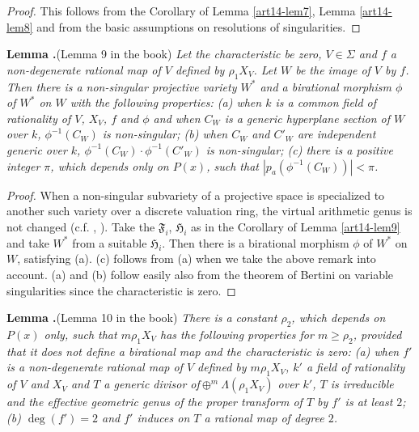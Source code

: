 \begin{proof}
This follows from the Corollary of Lemma \ref{art14-lem7}, Lemma \ref{art14-lem8} and from the basic assumptions on resolutions of singularities.
\end{proof}

\medskip
\noindent
{\bf Lemma .\label{art14-lem10}}(Lemma 9 in the book)
{\em 
Let the characteristic be zero, $V\in\Sigma$ and $f$ a non-degene\-rate rational map of $V$ defined by $\rho_{1}X_{V}$. Let $W$ be the image of $V$ by $f$. Then there is a non-singular projective variety $W^{*}$ and a birational morphism $\phi$ of $W^{*}$ on $W$ with the following properties: {\rm(a)} when $k$ is a common field of rationality of $V$, $X_{V}$, $f$ and $\phi$ and when $C_{W}$ is a generic hyperplane section of $W$ over $k$, $\phi^{-1}(C_{W})$ is non-singular; {\rm(b)} when $C_{W}$ and $C'_{W}$ are independent generic over $k$, $\phi^{-1}(C_{W})\cdot \phi^{-1}(C'_{W})$ is non-singular; {\rm(c)} there is a positive integer $\pi$, which depends only on $P(x)$, such that $|p_{a}(\phi^{-1}(C_{W}))|<\pi$.}

\begin{proof}
When a non-singular subvariety of a projective space is specialized to another such variety over a discrete valuation ring, the virtual arithmetic genus is not changed (c.f. \cite{art14-key2}, \cite{art14-key4}). Take the $\mathfrak{F}_{i}$, $\mathfrak{H}_{i}$ as in the Corollary of Lemma \ref{art14-lem9} and take $W^{*}$ from a suitable $\mathfrak{H}_{i}$. Then there is a birational morphism $\phi$ of $W^{*}$ on $W$, satisfying (a). (c) follows from (a) when we take the above remark into account. (a) and (b) follow easily also from the theorem of Bertini on variable singularities since the characteristic is zero.
\end{proof}

\smallskip
\noindent
{\bf Lemma .\label{art14-lem11}}(Lemma 10 in the book)
{\em There is a constant $\rho_{2}$, which depends on $P(x)$ only, such that $m\rho_{1}X_{V}$ has the following properties for $m\geq \rho_{2}$, provided that it does not define a birational map and the characteristic is zero: {\rm(a)} when $f'$ is a non-degenerate rational map of $V$ defined by $m\rho_{1}X_{V}$, $k'$ a field of rationality of $V$ and $X_{V}$ and $T$ a generic divisor of\pageoriginale $\oplus^{m}\Lambda(\rho_{1}X_{V})$ over $k'$, $T$ is irreducible and the effective geometric genus of the proper transform of $T$ by $f'$ is at least $2$; {\rm(b)} $\deg (f')=2$ and $f'$ induces on $T$ a rational map of degree $2$.}

